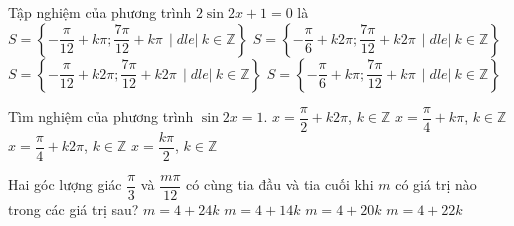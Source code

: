 \begin{ex}%
	Tập nghiệm của  phương trình $2\sin2x+1=0$ là
	\choice 
		 {\True $S=\left\{-\dfrac{\pi}{12}+k\pi;\dfrac{7\pi}{12}+k\pi\,\mid dle|\ k\in\mathbb{Z}\right\}$}
		{$S=\left\{-\dfrac{\pi}{6}+k2\pi;\dfrac{7\pi}{12}+k2\pi\,\mid  dle|\ k\in\mathbb{Z}\right\}$}
		{$S=\left\{-\dfrac{\pi}{12}+k2\pi;\dfrac{7\pi}{12}+k2\pi\,\mid dle|\  k\in\mathbb{Z}\right\}$}
		 {$S=\left\{-\dfrac{\pi}{6}+k\pi;\dfrac{7\pi}{12}+k\pi\,\mid dle|\ k\in\mathbb{Z}\right\}$}
\end{ex}

\begin{ex}%
	 Tìm nghiệm của phương trình $\sin 2x = 1$.
	 \choice
		{$x = \dfrac{\pi}{2} + k2\pi$, $k \in  \mathbb{Z}$}
		{\True $x = \dfrac{\pi}{4} + k\pi$, $k \in  \mathbb{Z}$}
		 {$x = \dfrac{\pi}{4} + k2\pi$, $k \in \mathbb{Z}$}
		{$x = \dfrac{k\pi}{2}$,  $k \in \mathbb{Z}$}
\end{ex}

\begin{ex}%
	Hai góc lượng giác $\dfrac{\pi}{3}$ và $\dfrac{m\pi}{12}$ có cùng tia đầu và tia cuối khi $m$ có giá trị nào trong  các giá trị sau?
	\choice 
		{\True $m=4+24k$} 
		{$m=4+14k$} 
		 {$m=4+20k$}
		 {$m=4+22k$}
\end{ex}

